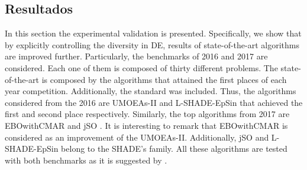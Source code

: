 \subsection{Resultados}
In this section the experimental validation is presented.
%
Specifically, we show that by explicitly controlling the diversity in DE, results of state-of-the-art algorithms
are improved further.
%
Particularly, the benchmarks of \CEC{} 2016 and \CEC{} 2017 are considered.
%
Each one of them is composed of thirty different problems.
%
The state-of-the-art is composed by the algorithms that attained the first places of each year competition.
%
Additionally, the standard \DE{} was included.
%
Thus, the algorithms considered from the \CEC{} 2016 are UMOEAs-II \cite{elsayed2016testing} and L-SHADE-EpSin \cite{awad2016ensemble} that achieved 
the first and second place respectively.
%
Similarly, the top algorithms from \CEC{} 2017 are EBOwithCMAR \cite{kumar2017improving} and jSO \cite{brest2017single}.
%
It is interesting to remark that EBOwithCMAR is considered as an improvement of the UMOEAs-II.
%
Additionally, jSO and L-SHADE-EpSin belong to the SHADE's family.
%
All these algorithms are tested with both benchmarks as it is suggested by \cite{molina2017analysis}.

